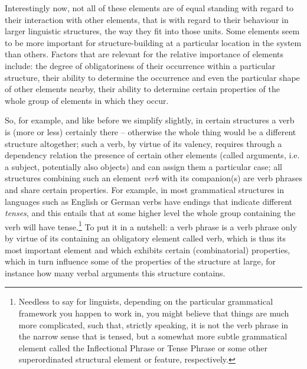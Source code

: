 \documentclass[output=paper
  ,nobabel
  ,draftmode
  ,colorlinks, citecolor=brown
]{langscibook}
\begin{document}
Interestingly now, not all of these elements are of equal standing with regard to their interaction
with other elements, that is with regard to their behaviour in larger linguistic structures, the way
they fit into those units. Some elements seem to be more important for structure-building at a
particular location in the system than others. Factors that are relevant for the relative importance
of elements include: the degree of obligatoriness of their occurrence within a particular structure,
their ability to determine the occurrence and even the particular shape of other elements nearby,
their ability to determine certain properties of the whole group of elements in which they occur.

So, for example, and like before we simplify slightly, in certain structures a verb is (more or
less) certainly there – otherwise the whole thing would be a different structure altogether; such a
verb, by virtue of its valency, requires through a dependency relation the presence of certain other
elements (called arguments, i.e. a subject, potentially also objects) and can assign them a
particular case; all structures combining such an element \emph{verb} with its companion(s) are
verb phrases and share certain properties. For example, in most grammatical structures in languages
such as English or German verbs have endings that indicate different \emph{tenses}, and this
entails that at some higher level the whole group containing the verb will have
tense.\footnote{Needless to say for linguists, depending on the particular grammatical framework you
  happen to work in, you might believe that things are much more complicated, such that, strictly
  speaking, it is not the verb phrase in the narrow sense that is tensed, but a somewhat more subtle
  grammatical element called the Inflectional Phrase or Tense Phrase or some other superordinated
  structural element or feature, respectively.}  To put it in a nutshell: a verb phrase is a verb
phrase only by virtue of its containing an obligatory element called verb, which is thus its most
important element and which exhibits certain (combinatorial) properties, which in turn influence
some of the properties of the structure at large, for instance how many verbal arguments this
structure contains.
\end{document}
